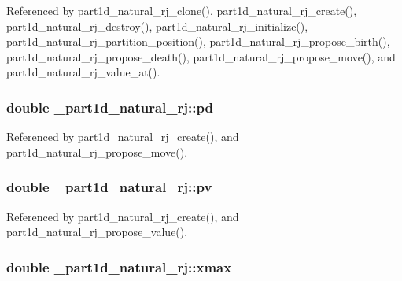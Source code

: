 Referenced by part1d\+\_\+natural\+\_\+rj\+\_\+clone(), part1d\+\_\+natural\+\_\+rj\+\_\+create(), part1d\+\_\+natural\+\_\+rj\+\_\+destroy(), part1d\+\_\+natural\+\_\+rj\+\_\+initialize(), part1d\+\_\+natural\+\_\+rj\+\_\+partition\+\_\+position(), part1d\+\_\+natural\+\_\+rj\+\_\+propose\+\_\+birth(), part1d\+\_\+natural\+\_\+rj\+\_\+propose\+\_\+death(), part1d\+\_\+natural\+\_\+rj\+\_\+propose\+\_\+move(), and part1d\+\_\+natural\+\_\+rj\+\_\+value\+\_\+at().

\subsubsection[{\texorpdfstring{pd}{pd}}]{\setlength{\rightskip}{0pt plus 5cm}double \+\_\+part1d\+\_\+natural\+\_\+rj\+::pd}\hypertarget{struct__part1d__natural__rj_a6bb0aa07bf2e8404a955bbc64179f5d6}{}\label{struct__part1d__natural__rj_a6bb0aa07bf2e8404a955bbc64179f5d6}


Referenced by part1d\+\_\+natural\+\_\+rj\+\_\+create(), and part1d\+\_\+natural\+\_\+rj\+\_\+propose\+\_\+move().

\subsubsection[{\texorpdfstring{pv}{pv}}]{\setlength{\rightskip}{0pt plus 5cm}double \+\_\+part1d\+\_\+natural\+\_\+rj\+::pv}\hypertarget{struct__part1d__natural__rj_a90b7c2ee4e95d8f74c8431cc146f977d}{}\label{struct__part1d__natural__rj_a90b7c2ee4e95d8f74c8431cc146f977d}


Referenced by part1d\+\_\+natural\+\_\+rj\+\_\+create(), and part1d\+\_\+natural\+\_\+rj\+\_\+propose\+\_\+value().

\subsubsection[{\texorpdfstring{xmax}{xmax}}]{\setlength{\rightskip}{0pt plus 5cm}double \+\_\+part1d\+\_\+natural\+\_\+rj\+::xmax}\hypertarget{struct__part1d__natural__rj_ade35da3c6eca825d12726dba6dffeef9}{}\label{struct__part1d__natural__rj_ade35da3c6eca825d12726dba6dffeef9}


